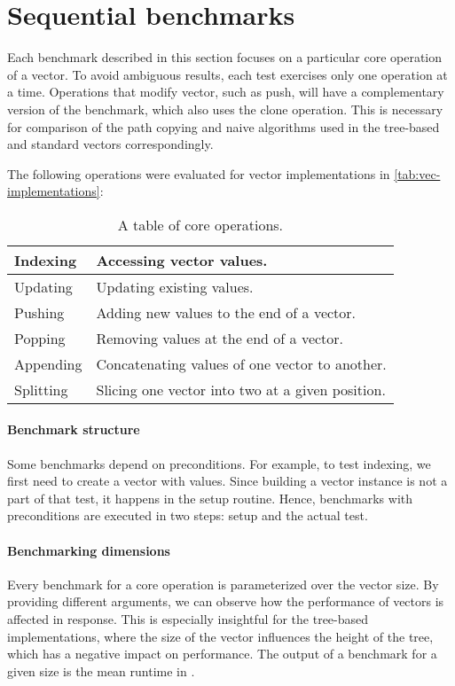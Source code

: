\section{Sequential benchmarks}
Each benchmark described in this section focuses on a particular core operation of a vector. To avoid ambiguous results, each test exercises only one operation at a time. Operations that modify vector, such as push, will have a complementary version of the benchmark, which also uses the clone operation. This is necessary for comparison of the path copying and naive algorithms used in the tree-based and standard vectors correspondingly.

The following operations were evaluated for vector implementations in \ref{tab:vec-implementations}:
\begin{table}[!htbp]
    \centering

    \begin{tabular} { |l| p{10cm} | }
        \hline
        Indexing & Accessing vector values. \\ \hline
        Updating & Updating existing values. \\ \hline
        Pushing & Adding new values to the end of a vector. \\ \hline
        Popping & Removing values at the end of a vector. \\ \hline
        Appending & Concatenating values of one vector to another. \\ \hline
        Splitting & Slicing one vector into two at a given position. \\ \hline
    \end{tabular}

    \label{tab:vec-core-operations}
    \caption{A table of core operations.}
\end{table}

\paragraph{Benchmark structure}
Some benchmarks depend on preconditions. For example, to test indexing, we first need to create a vector with values. Since building a vector instance is not a part of that test, it happens in the setup routine. Hence, benchmarks with preconditions are executed in two steps: setup and the actual test.

\paragraph{Benchmarking dimensions}
Every benchmark for a core operation is parameterized over the vector size. By providing different arguments, we can observe how the performance of vectors is affected in response. This is especially insightful for the tree-based implementations, where the size of the vector influences the height of the tree, which has a negative impact on performance. The output of a benchmark for a given size is the mean runtime in \millis{}.


